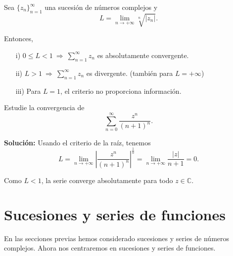 \begin{teorema}
Sea $\{z_n\}_{n=1}^{\infty}$ una sucesión de números complejos y 
$$L = \lim_{n \to + \infty} \sqrt[n]{|z_n|}.$$

Entonces,
\begin{itemize}
\item[i)] $0\leq L < 1 ~\Rightarrow~ \sum\limits_{n=1}^{\infty} z_n$ es absolutamente convergente.

\item[ii)] $L > 1 ~\Rightarrow~ \sum\limits_{n=1}^{\infty} z_n $ es divergente. \qquad (también para $L = + \infty$)

\item[iii)] Para $L = 1$, el criterio no proporciona información.
\end{itemize} 
\end{teorema}

\begin{ejemplo}
Estudie la convergencia de 
$$\sum_{n=0}^{\infty} \frac{z^n}{(n+1)^n}.$$

\textbf{Solución:} Usando el criterio de la raíz, tenemos
$$L = \lim_{n\to + \infty} \left| \frac{z^n}{(n+1)^n} \right|^{\frac{1}{n}}  = \lim_{n\to + \infty} \frac{|z|}{n+1} = 0.$$

Como $L < 1$, la serie converge absolutamente para todo $z \in \mathbb{C}$.
\end{ejemplo}

\section{Sucesiones y series de funciones}

En las secciones previas hemos considerado sucesiones y series de números complejos. Ahora nos centraremos en sucesiones y series de funciones.

